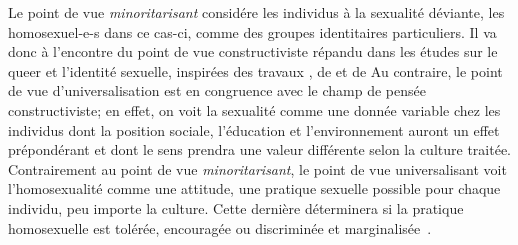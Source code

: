 Le point de vue \emph{minoritarisant} considére les individus à la sexualité déviante, les homosexuel-e-s dans ce cas-ci, comme des groupes identitaires particuliers. 
Il va donc à l'encontre du point de vue constructiviste répandu dans les études sur le queer et l'identité sexuelle, inspirées des travaux \citet{Foucault2011}, de \citet{Rubin2010} et de \citet{Butler2007} 
Au contraire, le point de vue d'universalisation est en congruence avec le champ de pensée constructiviste; en effet, on voit la sexualité comme une donnée variable chez les individus dont la position sociale, l'éducation et l'environnement auront un effet prépondérant et dont le sens prendra une valeur différente selon la culture traitée. 
Contrairement au point de vue \emph{minoritarisant}, le point de vue universalisant voit l'homosexualité comme une attitude, une pratique sexuelle possible pour chaque individu, peu importe la culture. 
Cette dernière déterminera si la pratique homosexuelle est tolérée, encouragée ou discriminée et marginalisée~\citep[271]{Sinfield1996}.

